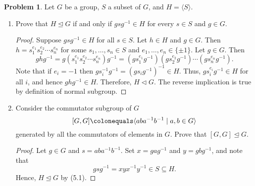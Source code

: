 \documentclass[11pt]{article}
\newcommand{\norm}{\trianglelefteq}
\theoremstyle{definition}
\newtheorem{problem}{Problem}
\begin{document}
\begin{problem}
Let $G$ be a group, $S$ a subset of $G$, and $H=\langle S \rangle$.  

\begin{enumerate}[(5.1)]
\item Prove that $H \norm G$ if and only if $gsg^{-1}\in H$ for every $s\in S$ and $g\in G$.

\begin{proof}	
Suppose $gsg^{-1}\in H$ for all $s\in S$.  Let $h\in H$ and $g\in G$. Then $h=s_1^{e_1}s_2^{e_2}\cdots s_n^{e_n}$ for some $s_1,\dots,s_n\in S$ and $e_1,\dots,e_n\in \{\pm 1\}$.  Let $g\in G$.  Then
$$ghg^{-1}= g (s_1^{e_1}s_2^{e_2}\cdots s_n^{e_n}) g^{-1} = (gs_1^{e_1}g^{-1})(gs_2^{e_2}g^{-1})\cdots (gs_n^{e_n}g^{-1}).$$
Note that if $e_i=-1$ then $gs_i^{-1}g^{-1}=(gs_ig^{-1})^{-1}\in H$.   Thus, $gs_i^{e_i}g^{-1}\in H$ for all $i$, and hence $ghg^{-1}\in H$.  Therefore, $H\triangleleft G$.  The reverse implication is true by definition of normal subgroup.
\end{proof}


\item Consider the commutator subgroup of $G$
$$[G,G] \colonequals \langle aba^{-1}b^{-1}\mid a,b\in G \rangle$$ 
generated by all the commutators of elements in $G$.
Prove that $[G,G] \norm G$.

\begin{proof}
Let $g\in G$ and $s=aba^{-1}b^{-1}$. Set $x=gag^{-1}$ and $y=gbg^{-1}$, and note that 
$$gsg^{-1}=xyx^{-1}y^{-1}\in S\subseteq H.$$
Hence, $H\norm G$ by (5.1).
\end{proof}

\end{enumerate}
\end{problem}
\end{document}

